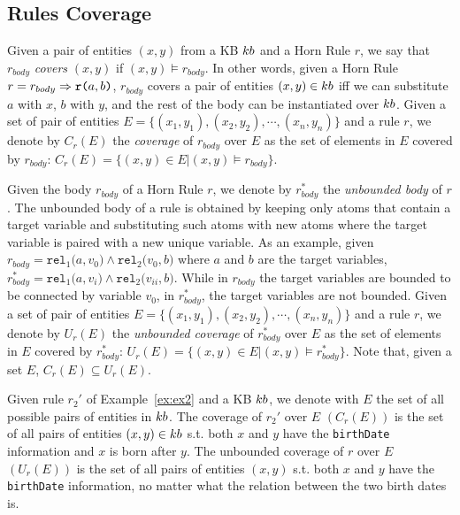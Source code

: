 \subsection{Rules Coverage}
Given a pair of entities $(x,y)$ from a KB ${\sc kb}$ and a Horn Rule $r$, we say that $r_{body}$ \emph{covers} $(x,y)$ if
$(x,y) \models r_{body}$. In other words, given a Horn Rule $r = r_{body} \Rightarrow \texttt{r(}a,b\texttt{)}$, $r_{body}$ covers a pair of entities $(x,y) \in {\sc kb}$ iff we can substitute $a$ with $x$, $b$ with $y$, and the rest of the body can be instantiated over ${\sc kb}$. Given a set of pair of entities $E = \{(x_1,y_1),(x_2,y_2),\cdots,(x_n,y_n)\}$ and a rule $r$, we denote by $C_r(E)$ the \emph{coverage} of $r_{body}$ over $E$ as the set of elements in $E$ covered by $r_{body}$: $C_r(E)=\{(x,y) \in E | (x,y) \models r_{body}\}$.

Given the body $r_{body}$ of a Horn Rule $r$, we denote by $r^{*}_{body}$ the \emph{unbounded body} of $r$. The unbounded body of a rule is obtained by keeping only atoms that contain a target variable and substituting such atoms with new atoms where the target variable is paired with a new unique variable. As an example, given $r_{body} = \texttt{rel}_1\texttt{(}a,v_0\texttt{)} \wedge \texttt{rel}_2\texttt{(}v_0,b\texttt{)}$ where $a$ and $b$ are the target variables, $r^{*}_{body} = \texttt{rel}_1\texttt{(}a,v_i\texttt{)} \wedge \texttt{rel}_2\texttt{(}v_{ii},b\texttt{)}$.
While in $r_{body}$ the target variables are bounded to be connected by variable $v_0$, in $r^{*}_{body}$, the target variables are not bounded.
Given a set of pair of entities $E = \{(x_1,y_1),(x_2,y_2),\cdots,(x_n,y_n)\}$ and a rule $r$, we denote by $U_r(E)$ the \emph{unbounded coverage} of $r^{*}_{body}$ over $E$ as the set of elements in $E$ covered by $r^{*}_{body}$: $U_r(E)=\{(x,y) \in E | (x,y) \models r^{*}_{body}\}$. Note that, given a set $E$, $C_r(E) \subseteq U_r(E)$. 

\begin{example}
	Given rule $r_2'$ of Example~\ref{ex:ex2} and a KB ${\sc kb}$, we denote with $E$ the set of all possible pairs of entities in ${\sc kb}$. The coverage of $r_2'$ over $E$ $(C_r(E))$ is the set of all pairs of entities $(x,y) \in {\sc kb}$ s.t. both $x$ and $y$ have the \texttt{birthDate} information and $x$ is born after $y$. The unbounded coverage of $r$ over $E$ $(U_r(E))$ is the set of all pairs of entities $(x,y)$ s.t. both $x$ and $y$ have the \texttt{birthDate} information, no matter what the relation between the two birth dates is. 
\end{example} 

